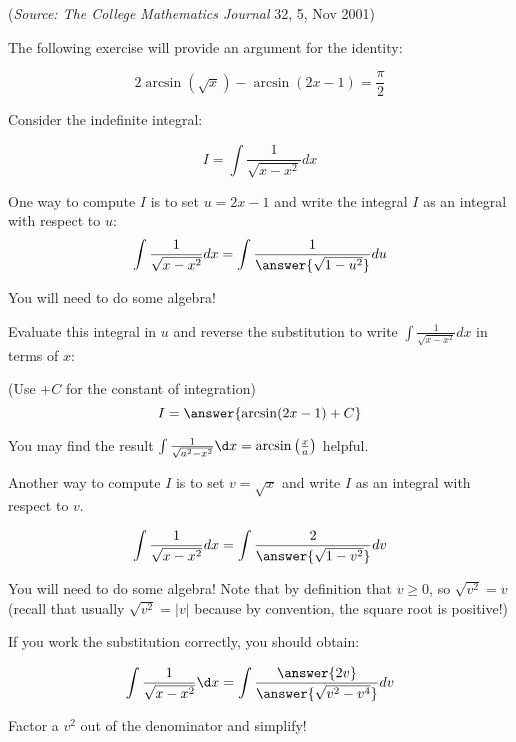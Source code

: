 \documentclass{ximera}
\author{Jim Talamo}
\begin{document}
(\emph{Source: The College Mathematics Journal} 32, 5, Nov 2001)

\begin{exercise}
The following exercise will provide an argument for the identity:

\[
2 \arcsin(\sqrt{x})-\arcsin(2x-1)= \frac{\pi}{2}
\]

Consider the indefinite integral: 

\[
I = \int \frac{1}{\sqrt{x-x^2}} dx
\]


\begin{exercise}
One way to compute $I$ is to set $u=2x-1$ and write the integral $I$ as an integral with respect to $u$:
\[
\int \frac{1}{\sqrt{x-x^2}} dx = \int\frac{1}{ \answer{\sqrt{1-u^2}}} du
\]
\begin{hint}
You will need to do some algebra!
\end{hint}

\begin{exercise}
Evaluate this integral in $u$ and reverse the substitution to write $\int \frac{1}{\sqrt{x-x^2}} dx$ in terms of $x$:

(Use $+C$ for the constant of integration)
\[
I = \answer{\arcsin(2x-1)+C}
\]

\begin{hint}
You may find the result $\int \frac{1}{\sqrt{a^2-x^2}} \d x = \arcsin\left(\frac{x}{a}\right)$ helpful.
\end{hint}

\end{exercise}

\begin{exercise}
Another way to compute $I$ is to set $v=\sqrt{x}$ and write $I$ as an integral with respect to $v$.

\[
\int \frac{1}{\sqrt{x-x^2}} dx  = \int\frac{2}{ \answer{\sqrt{1-v^2}}} dv
\]
\begin{hint}
You will need to do some algebra! Note that by definition that $v\geq 0$, so $\sqrt{v^2} = v$ (recall that usually $\sqrt{v^2} = |v|$ because by convention, the square root is positive!)

If you work the substitution correctly, you should obtain:

\[
\int \frac{1}{\sqrt{x-x^2}} \d x  = \int\frac{\answer{2v}}{ \answer{\sqrt{v^2-v^4}}} dv
\]

Factor a $v^2$ out of the denominator and simplify!
\end{hint}


\end{exercise}


\end{exercise}
\end{exercise}
\end{document}
